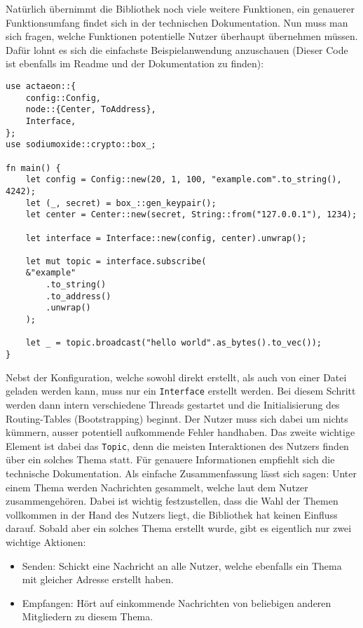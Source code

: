 \documentclass[11pt]{article}
\begin{document}
\noindent Natürlich übernimmt die Bibliothek noch viele weitere
Funktionen, ein genauerer Funktionsumfang findet sich in der
technischen Dokumentation. Nun muss man sich fragen, welche Funktionen
potentielle Nutzer überhaupt übernehmen müssen. Dafür lohnt es sich
die einfachste Beispielanwendung anzuschauen (Dieser Code ist
ebenfalls im Readme und der Dokumentation zu finden):
\begin{verbatim}
use actaeon::{
    config::Config,
    node::{Center, ToAddress},
    Interface,
};
use sodiumoxide::crypto::box_;

fn main() {
    let config = Config::new(20, 1, 100, "example.com".to_string(), 4242);
    let (_, secret) = box_::gen_keypair();
    let center = Center::new(secret, String::from("127.0.0.1"), 1234);

    let interface = Interface::new(config, center).unwrap();

    let mut topic = interface.subscribe(
	&"example"
	    .to_string()
	    .to_address()
	    .unwrap()
    );

    let _ = topic.broadcast("hello world".as_bytes().to_vec());
}
\end{verbatim}

\noindent Nebst der Konfiguration, welche sowohl direkt erstellt, als
auch von einer Datei geladen werden kann, muss nur ein \texttt{Interface}
erstellt werden. Bei diesem Schritt werden dann intern verschiedene
Threads gestartet und die Initialisierung des Routing-Tables
(Bootstrapping) beginnt. Der Nutzer muss sich dabei um nichts kümmern,
ausser potentiell aufkommende Fehler handhaben. Das zweite wichtige
Element ist dabei das \texttt{Topic}, denn die meisten Interaktionen des
Nutzers finden über ein solches Thema statt. Für genauere
Informationen empfiehlt sich die technische Dokumentation. Als
einfache Zusammenfassung lässt sich sagen: Unter einem Thema werden
Nachrichten gesammelt, welche laut dem Nutzer zusammengehören. Dabei
ist wichtig festzustellen, dass die Wahl der Themen vollkommen in der
Hand des Nutzers liegt, die Bibliothek hat keinen Einfluss darauf.
Sobald aber ein solches Thema erstellt wurde, gibt es eigentlich nur
zwei wichtige Aktionen:
\begin{itemize}
\item Senden: Schickt eine Nachricht an alle Nutzer, welche ebenfalls ein
Thema mit gleicher Adresse erstellt haben.
\item Empfangen: Hört auf einkommende Nachrichten von beliebigen anderen
Mitgliedern zu diesem Thema.
\end{itemize}
\end{document}
